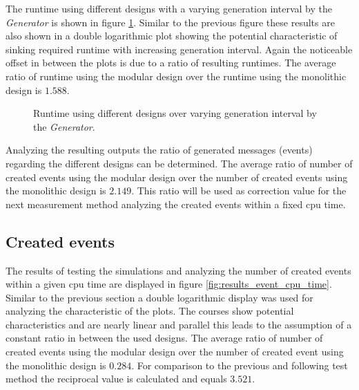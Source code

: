 The runtime using different designs with a varying generation interval by the \emph{Generator} is shown in figure \ref{fig:results_runtime_generation}.
Similar to the previous figure these results are also shown in a double logarithmic plot showing the potential characteristic of sinking required runtime with increasing generation interval.
Again the noticeable offset in between the plots is due to a ratio of resulting runtimes.
The average ratio of runtime using the modular design over the runtime using the monolithic design is $1.588$.
\\

\begin{figure}
    \centering
    \caption{Runtime using different designs over varying generation interval by the \emph{Generator}.}
    \label{fig:results_runtime_generation}
\end{figure}


Analyzing the resulting outputs the ratio of generated messages (events) regarding the different designs can be determined.
The average ratio of number of created events using the modular design over the number of created events using the monolithic design is $2.149$.
This ratio will be used as correction value for the next measurement method analyzing the created events within a fixed cpu time.

\subsection{Created events}
\label{sec:measurements_sequential_event}

The results of testing the simulations and analyzing the number of created events within a given cpu time are displayed in figure \ref{fig:results_event_cpu_time}.
Similar to the previous section a double logarithmic display was used for analyzing the characteristic of the plots.
The courses show potential characteristics and are nearly linear and parallel this leads to the assumption of a constant ratio in between the used designs.
The average ratio of number of created events using the modular design over the number of created event using the monolithic design is $0.284$. %
For comparison to the previous and following test method the reciprocal value is calculated and equals $3.521$.
\\

